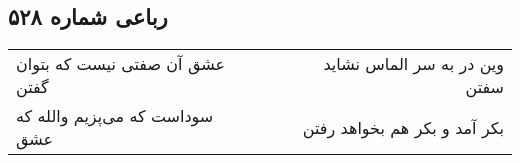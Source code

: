 \begin{center}
\section*{رباعی شماره ۵۲۸}
\label{sec:sh528}
\begin{longtable}{l p{0.5cm} r}
عشق آن صفتی نیست که بتوان گفتن
&&
وین در به سر الماس نشاید سفتن
\\
سوداست که می‌پزیم والله که عشق
&&
بکر آمد و بکر هم بخواهد رفتن
\\
\end{longtable}
\end{center}
